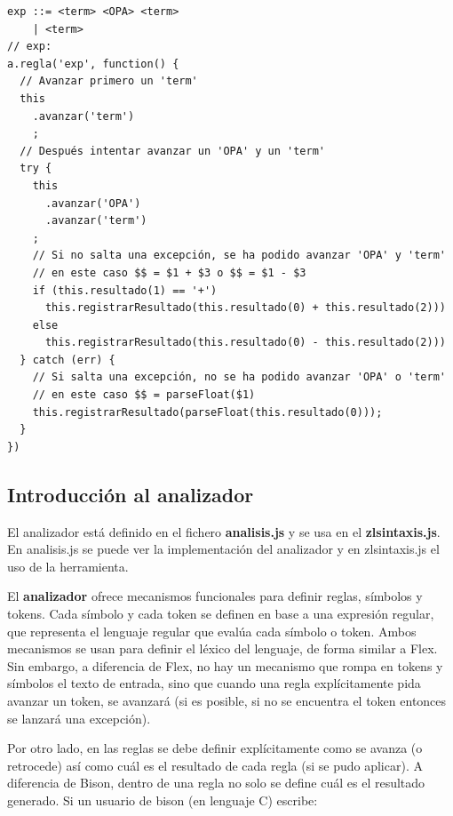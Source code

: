 \documentclass{report}
\begin{document}
\begin{BVerbatim}
exp ::= <term> <OPA> <term>     
    | <term>                
// exp:
a.regla('exp', function() {
  // Avanzar primero un 'term'
  this
    .avanzar('term')
    ;
  // Después intentar avanzar un 'OPA' y un 'term'
  try {
    this
      .avanzar('OPA')
      .avanzar('term')
    ;
    // Si no salta una excepción, se ha podido avanzar 'OPA' y 'term'
    // en este caso $$ = $1 + $3 o $$ = $1 - $3 
    if (this.resultado(1) == '+')
      this.registrarResultado(this.resultado(0) + this.resultado(2)))
    else
      this.registrarResultado(this.resultado(0) - this.resultado(2)))
  } catch (err) {
    // Si salta una excepción, no se ha podido avanzar 'OPA' o 'term'
    // en este caso $$ = parseFloat($1)
    this.registrarResultado(parseFloat(this.resultado(0)));
  }
})
\end{BVerbatim}

	\subsection{Introducción al analizador}
	
	
	El analizador está definido en el fichero \textbf{analisis.js} y se usa en el \textbf{zlsintaxis.js}. En analisis.js se puede ver la implementación del analizador y en zlsintaxis.js el uso de la herramienta.
	
	\vspace{10px}
	
	El \textbf{analizador} ofrece mecanismos funcionales\cite{javascriptfunctional} para definir reglas, símbolos y tokens. Cada símbolo y cada token se definen en base a una expresión regular, que representa el lenguaje regular que evalúa cada símbolo o token. Ambos mecanismos se usan para definir el léxico del lenguaje, de forma similar a Flex. Sin embargo, a diferencia de Flex, no hay un mecanismo que rompa en tokens y símbolos el texto de entrada, sino que cuando una regla explícitamente pida avanzar un token, se avanzará (si es posible, si no se encuentra el token entonces se lanzará una excepción).
	
	\vspace{10px}
	
	Por otro lado, en las reglas se debe definir explícitamente como se avanza (o retrocede) así como cuál es el resultado de cada regla (si se pudo aplicar). A diferencia de Bison, dentro de una regla no solo se define cuál es el resultado generado. Si un usuario de bison (en lenguaje C) escribe:
	
\end{document}
